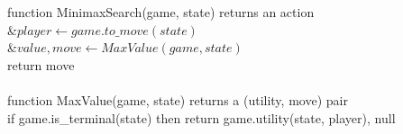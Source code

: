 \documentclass[preview]{standalone}
\begin{document}
\begin{center}
function MinimaxSearch(game, state) returns an action\\&$player \gets game.to\_move(state)$\\&$value, move \gets MaxValue(game, state)$\\return move\\\\function MaxValue(game, state) returns a (utility, move) pair\\if game.is\_terminal(state) then return game.utility(state, player), null
\end{center}
\end{document}
